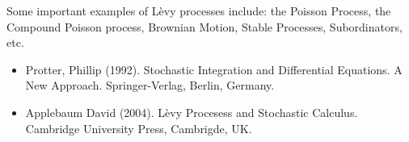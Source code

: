 \documentclass[12pt]{article}
\def\levy{L\`evy }
\begin{document}
Some important examples of \levy processes include: the Poisson
Process, the Compound Poisson process, Brownian Motion, Stable Processes,
Subordinators, etc.\vskip 1pc

\begin{itemize}
\item{} Protter, Phillip (1992). Stochastic Integration and Differential Equations. A New Approach. Springer-Verlag, Berlin, Germany.
\item{} Applebaum David (2004). \levy Procesess and Stochastic Calculus.  Cambridge University Press, Cambrigde, UK.
\end{itemize}
\end{document}
